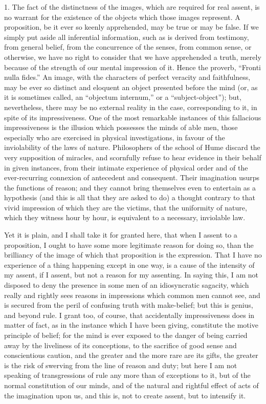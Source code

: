 1. The fact of the distinctness of the images, which are required
for real assent, is no warrant for the existence of the objects which
those images represent. A proposition, be it ever so keenly
apprehended, may be true or may be false. If we simply put aside all
inferential information, such as is derived from testimony, from
general belief, from the concurrence of the senses, from common sense,
or otherwise, we have no right to consider that we have apprehended a
truth, merely because of the strength of our mental impression of it.
Hence the proverb, ``Fronti nulla fides.'' An image, with
the characters of perfect veracity and faithfulness, may be ever so
distinct and eloquent an object presented before the mind (or, as it
is sometimes called, an ``objectum internum,'' or a
``subject-object''); but, nevertheless, there may be no
external reality in the case, corresponding to it, in spite of its
impressiveness. One of the most remarkable instances of this
fallacious impressiveness is the illusion which possesses the minds of
able men, those especially who are exercised in physical
investigations, in favour of the inviolability of the laws of nature.
Philosophers of the school of Hume discard the very supposition of
miracles, and scornfully refuse to hear evidence in their behalf in
given instances, from their intimate experience of physical order and
of the ever-recurring connexion of antecedent and consequent. Their
imagination usurps the functions of reason; and they cannot bring
themselves even to entertain as a hypothesis (and this is all that
they are asked to do) a thought contrary to that vivid impression of
which they are the victims, that the uniformity of nature, which they
witness hour by hour, is equivalent to a necessary, inviolable law.

Yet it is plain, and I shall take it for granted here, that when I
assent to a proposition, I ought to have some more legitimate reason
for doing so, than the brilliancy of the image of which that
proposition is the expression. That I have no experience of a thing
happening except in one way, is a cause of the intensity of my assent,
if I assent, but not a reason for my assenting. In saying this, I am
not disposed to deny the presence in some men of an idiosyncratic
sagacity, which really and rightly sees reasons in impressions
which common men cannot see, and is secured from the peril of
confusing truth with make-belief; but this is genius, and beyond rule.
I grant too, of course, that accidentally impressiveness does in
matter of fact, as in the instance which I have been giving,
constitute the motive principle of belief; for the mind is ever
exposed to the danger of being carried away by the liveliness of its
conceptions, to the sacrifice of good sense and conscientious caution,
and the greater and the more rare are its gifts, the greater is the
risk of swerving from the line of reason and duty; but here I am not
speaking of transgressions of rule any more than of exceptions to it,
but of the normal constitution of our minds, and of the natural and
rightful effect of acts of the imagination upon us, and this is, not
to create assent, but to intensify it.

